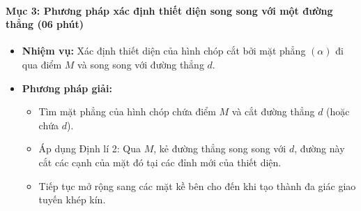 \documentclass[12pt, a4paper]{article}
\begin{document}
\paragraph{Mục 3: Phương pháp xác định thiết diện song song với một đường thẳng (06 phút)}
\begin{itemize}
    \item \textbf{Nhiệm vụ:} Xác định thiết diện của hình chóp cắt bởi mặt phẳng $(\alpha)$ đi qua điểm $M$ và song song với đường thẳng $d$.
    \item \textbf{Phương pháp giải:}
    \begin{itemize}
        \item Tìm mặt phẳng của hình chóp chứa điểm $M$ và cắt đường thẳng $d$ (hoặc chứa $d$).
        \item Áp dụng Định lí 2: Qua $M$, kẻ đường thẳng song song với $d$, đường này cắt các cạnh của mặt đó tại các đỉnh mới của thiết diện.
        \item Tiếp tục mở rộng sang các mặt kề bên cho đến khi tạo thành đa giác giao tuyến khép kín.
    \end{itemize}
\end{itemize}
\end{document}
